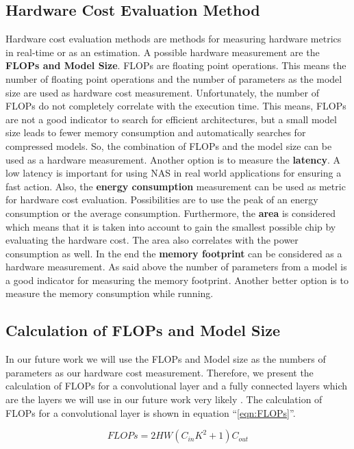 \documentclass[conference]{IEEEtran}
\begin{document}
\subsection{Hardware Cost Evaluation Method}
Hardware cost evaluation methods are methods for measuring hardware metrics in real-time or as an estimation. A possible hardware measurement are the \textbf{FLOPs and Model Size}. FLOPs are floating point operations. This means the number of floating point operations and the number of parameters as the model size are used as hardware cost measurement. Unfortunately, the number of FLOPs do not completely correlate with the execution time. This means, FLOPs are not a good indicator to search for efficient architectures, but a small model size leads to fewer memory consumption and automatically searches for compressed models. So, the combination of FLOPs and the model size can be used as a hardware measurement. Another option is to measure the \textbf{latency}. A low latency is important for using NAS in real world applications for ensuring a fast action. Also, the \textbf{energy consumption} measurement can be used as metric for hardware cost evaluation. Possibilities are to use the peak of an energy consumption or the average consumption. Furthermore, the \textbf{area} is considered which means that it is taken into account to gain the smallest possible chip by evaluating the hardware cost. The area also correlates with the power consumption as well. In the end the \textbf{memory footprint} can be considered as a hardware measurement. As said above the number of parameters from a model is a good indicator for measuring the memory footprint. Another better option is to measure the memory consumption while running. 

\subsection{Calculation of FLOPs and Model Size}
In our future work we will use the FLOPs and Model size as the numbers of parameters as our hardware cost measurement. Therefore, we present the calculation of FLOPs for a convolutional layer and a fully connected layers which are the layers we will use in our future work very likely \cite{bib5}. The calculation of FLOPs for a convolutional layer is shown in equation ``\eqref{eqn:FLOPs}''.

\begin{equation}
\label{eqn:FLOPs}
FLOPs = 2HW(C_{in}K^{2}+1)C_{out}
\end{equation} 
\end{document}
